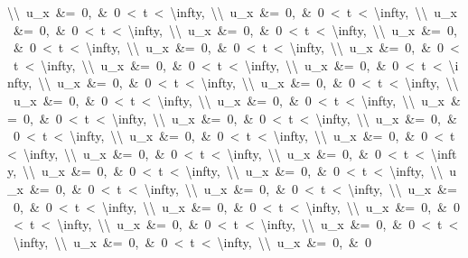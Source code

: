 \documentclass[
  ukrainian,
]{article}
\begin{document}
\textbackslash{}\textbackslash{}\ u\_x\ \&=\ 0,\ \&\ 0\ \textless{}\ t\ \textless{}\ \textbackslash{}infty,\ \textbackslash{}\textbackslash{}\ u\_x\ \&=\ 0,\ \&\ 0\ \textless{}\ t\ \textless{}\ \textbackslash{}infty,\ \textbackslash{}\textbackslash{}\ u\_x\ \&=\ 0,\ \&\ 0\ \textless{}\ t\ \textless{}\ \textbackslash{}infty,\ \textbackslash{}\textbackslash{}\ u\_x\ \&=\ 0,\ \&\ 0\ \textless{}\ t\ \textless{}\ \textbackslash{}infty,\ \textbackslash{}\textbackslash{}\ u\_x\ \&=\ 0,\ \&\ 0\ \textless{}\ t\ \textless{}\ \textbackslash{}infty,\ \textbackslash{}\textbackslash{}\ u\_x\ \&=\ 0,\ \&\ 0\ \textless{}\ t\ \textless{}\ \textbackslash{}infty,\ \textbackslash{}\textbackslash{}\ u\_x\ \&=\ 0,\ \&\ 0\ \textless{}\ t\ \textless{}\ \textbackslash{}infty,\ \textbackslash{}\textbackslash{}\ u\_x\ \&=\ 0,\ \&\ 0\ \textless{}\ t\ \textless{}\ \textbackslash{}infty,\ \textbackslash{}\textbackslash{}\ u\_x\ \&=\ 0,\ \&\ 0\ \textless{}\ t\ \textless{}\ \textbackslash{}infty,\ \textbackslash{}\textbackslash{}\ u\_x\ \&=\ 0,\ \&\ 0\ \textless{}\ t\ \textless{}\ \textbackslash{}infty,\ \textbackslash{}\textbackslash{}\ u\_x\ \&=\ 0,\ \&\ 0\ \textless{}\ t\ \textless{}\ \textbackslash{}infty,\ \textbackslash{}\textbackslash{}\ u\_x\ \&=\ 0,\ \&\ 0\ \textless{}\ t\ \textless{}\ \textbackslash{}infty,\ \textbackslash{}\textbackslash{}\ u\_x\ \&=\ 0,\ \&\ 0\ \textless{}\ t\ \textless{}\ \textbackslash{}infty,\ \textbackslash{}\textbackslash{}\ u\_x\ \&=\ 0,\ \&\ 0\ \textless{}\ t\ \textless{}\ \textbackslash{}infty,\ \textbackslash{}\textbackslash{}\ u\_x\ \&=\ 0,\ \&\ 0\ \textless{}\ t\ \textless{}\ \textbackslash{}infty,\ \textbackslash{}\textbackslash{}\ u\_x\ \&=\ 0,\ \&\ 0\ \textless{}\ t\ \textless{}\ \textbackslash{}infty,\ \textbackslash{}\textbackslash{}\ u\_x\ \&=\ 0,\ \&\ 0\ \textless{}\ t\ \textless{}\ \textbackslash{}infty,\ \textbackslash{}\textbackslash{}\ u\_x\ \&=\ 0,\ \&\ 0\ \textless{}\ t\ \textless{}\ \textbackslash{}infty,\ \textbackslash{}\textbackslash{}\ u\_x\ \&=\ 0,\ \&\ 0\ \textless{}\ t\ \textless{}\ \textbackslash{}infty,\ \textbackslash{}\textbackslash{}\ u\_x\ \&=\ 0,\ \&\ 0\ \textless{}\ t\ \textless{}\ \textbackslash{}infty,\ \textbackslash{}\textbackslash{}\ u\_x\ \&=\ 0,\ \&\ 0\ \textless{}\ t\ \textless{}\ \textbackslash{}infty,\ \textbackslash{}\textbackslash{}\ u\_x\ \&=\ 0,\ \&\ 0\ \textless{}\ t\ \textless{}\ \textbackslash{}infty,\ \textbackslash{}\textbackslash{}\ u\_x\ \&=\ 0,\ \&\ 0\ \textless{}\ t\ \textless{}\ \textbackslash{}infty,\ \textbackslash{}\textbackslash{}\ u\_x\ \&=\ 0,\ \&\ 0\ \textless{}\ t\ \textless{}\ \textbackslash{}infty,\ \textbackslash{}\textbackslash{}\ u\_x\ \&=\ 0,\ \&\ 0\ \textless{}\ t\ \textless{}\ \textbackslash{}infty,\ \textbackslash{}\textbackslash{}\ u\_x\ \&=\ 0,\ \&\ 0\ \textless{}\ t\ \textless{}\ \textbackslash{}infty,\ \textbackslash{}\textbackslash{}\ u\_x\ \&=\ 0,\ \&\ 0\ \textless{}\ t\ \textless{}\ \textbackslash{}infty,\ \textbackslash{}\textbackslash{}\ u\_x\ \&=\ 0,\ \&\ 0\ \textless{}\ t\ \textless{}\ \textbackslash{}infty,\ \textbackslash{}\textbackslash{}\ u\_x\ \&=\ 0,\ \&\ 0\ \textless{}\ t\ \textless{}\ \textbackslash{}infty,\ \textbackslash{}\textbackslash{}\ u\_x\ \&=\ 0,\ \&\ 0\ \textless{}\ t\ \textless{}\ \textbackslash{}infty,\ \textbackslash{}\textbackslash{}\ u\_x\ \&=\ 0,\ \&\ 0\ 
\end{document}
